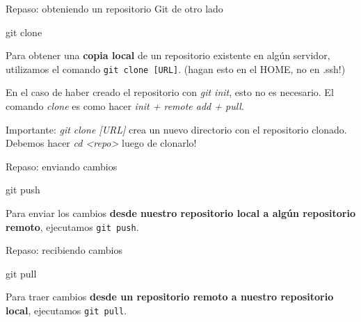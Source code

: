 \begin{frame}[t]{Repaso: obteniendo un repositorio Git de otro lado}
    \begin{comando}
        git clone
    \end{comando}

    \begin{block}{}
        Para obtener una \textbf{copia local} de un repositorio existente en algún servidor,
        utilizamos el comando \texttt{git clone [URL]}. (hagan esto en el HOME, no en .ssh!)

        En el caso de haber creado el repositorio con \textit{git init}, esto no es necesario. El comando \textit{clone} es como hacer \textit{init + remote add + pull}.
    \end{block}
    \begin{block}{}
        Importante: \textit{git clone [URL]} crea un nuevo directorio con el
        repositorio clonado. Debemos hacer \textit{cd <repo>} luego de clonarlo!
    \end{block}
\end{frame}

\begin{frame}[t]{Repaso: enviando cambios}
    \begin{comando}
        git push
    \end{comando}

    \pause
    \begin{block}{}
        Para enviar los cambios \textbf{desde nuestro repositorio local a algún
        repositorio remoto}, ejecutamos \texttt{git push}.
    \end{block}

\end{frame}


\begin{frame}[t]{Repaso: recibiendo cambios}
    \begin{comando}
        git pull
    \end{comando}

    \begin{block}{}
        Para traer cambios \textbf{desde un repositorio remoto a nuestro repositorio local},
        ejecutamos \texttt{git pull}.
    \end{block}
\end{frame}

